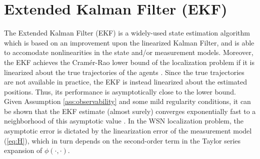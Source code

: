 \documentclass[twocolumn]{article}
\theoremstyle{plain}
\theoremstyle{definition}
\theoremstyle{definition}
\theoremstyle{remark}
\begin{document}
\section{Extended Kalman Filter (EKF)}
\label{sec:ekf}
The Extended Kalman Filter (EKF) is a widely-used state estimation algorithm which is based on an improvement upon the linearized Kalman Filter, and is able to accomodate nonlinearities in the state and/or measurement models. 
Moreover, the EKF achieves the Cram\'er-Rao lower bound of the localization problem if it is linearized about the true trajectories of the agents \cite{ekfCRLB}. Since the true trajectories are not available in practice, the EKF is instead linearized about the estimated positions. Thus, its performance is asymptotically close to the lower bound. 
Given Assumption \ref{ass:observability} and some mild regularity conditions, it can be shown that the EKF estimate (almost surely) converges exponentially fast to a neighborhood of this asymptotic value \cite{ekf1999}.
In the WSN localization problem, the asymptotic error is dictated by the linearization error of the measurement model (\ref{eq:H}), which in turn depends on the second-order term in the Taylor series expansion of $\phi(\cdot, \cdot)$.
\end{document}
